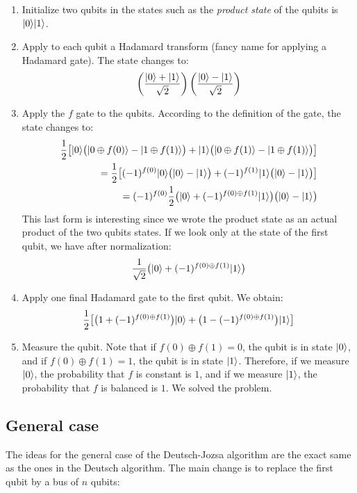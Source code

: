 \documentclass[12pt,a4paper]{article}
\theoremstyle{plain}
\theoremstyle{definition}
\DeclarePairedDelimiter\ket{\lvert}{\rangle}
\begin{document}
\begin{enumerate}
    \item Initialize two qubits in the states such as the \emph{product state} of the qubits is $\ket{0}\ket{1}$.
    \item Apply to each qubit a Hadamard transform (fancy name for applying a Hadamard gate). The state changes to:
    \begin{equation*}
        \left(\frac{\ket{0}+\ket{1}}{\sqrt{2}}\right) \left(\frac{\ket{0}-\ket{1}}{\sqrt{2}}\right)
    \end{equation*}
    \item Apply the $f$ gate to the qubits. According to the definition of the gate, the state changes to:
    \begin{align*}
        \frac{1}{2}\big[\ket{0}\big(\ket{0\oplus f(0)} - \ket{1\oplus f(1)}\big) + \ket{1}\big(\ket{0\oplus f(1)} - \ket{1\oplus f(1)}\big) \big] \\
        = \frac{1}{2}\big[(-1)^{f(0)}\ket{0}\big(\ket{0} - \ket{1}\big) + (-1)^{f(1)}\ket{1}\big(\ket{0} - \ket{1}\big) \big] \\
        = (-1)^{f(0)}\frac{1}{2}\big( \ket{0} + (-1)^{f(0)\oplus f(1)} \ket{1}\big)\big( \ket{0}-\ket{1}\big)
    \end{align*}
    This last form is interesting since we wrote the product state as an actual product of the two qubits states. If we look only at the state of the first qubit, we have after normalization:
    \begin{equation*}
        \frac{1}{\sqrt{2}}\big(\ket{0} + (-1)^{f(0)\oplus f(1)}\ket{1}\big)
    \end{equation*}
    \item Apply one final Hadamard gate to the first qubit. We obtain:
    \begin{equation*}
        \frac{1}{2} \big[ \big(1+(-1)^{f(0)\oplus f(1)}\big)\ket{0} + \big(1-(-1)^{f(0)\oplus f(1)}\big)\ket{1} \big]
    \end{equation*}
    \item Measure the qubit. Note that if $f(0)\oplus f(1) = 0$, the qubit is in state $\ket{0}$, and if $f(0)\oplus f(1) = 1$, the qubit is in state $\ket{1}$. Therefore, if we measure $\ket{0}$, the probability that $f$ is constant is $1$, and if we measure $\ket{1}$, the probability that $f$ is balanced is $1$. We solved the problem.
\end{enumerate}

\subsection{General case}
The ideas for the general case of the Deutsch-Jozsa algorithm are the exact same as the ones in the Deutsch algorithm. The main change is to replace the first qubit by a bus of $n$ qubits:
\end{document}

